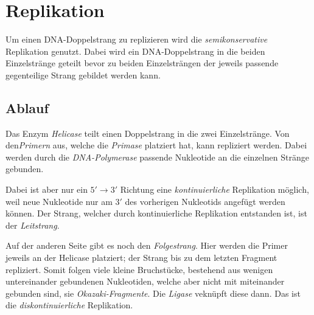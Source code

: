 \documentclass{article}
\begin{document}
\section{Replikation}
Um einen DNA-Doppelstrang zu replizieren wird die \emph{semikonservative} Replikation genutzt. Dabei wird ein DNA-Doppelstrang in die beiden Einzelstränge geteilt bevor zu beiden Einzelsträngen der jeweils passende gegenteilige Strang gebildet werden kann.
 
\subsection{Ablauf}
Das Enzym \emph{Helicase} teilt einen Doppelstrang in die zwei Einzelstränge. Von den\emph{Primern} aus, welche die \emph{Primase} platziert hat, kann repliziert werden. Dabei werden durch die \emph{DNA-Polymerase} passende Nukleotide an die einzelnen Stränge gebunden.
 
Dabei ist aber nur ein $5' \rightarrow 3'$ Richtung eine \emph{kon­ti­nu­ier­liche} Replikation möglich, weil neue Nukleotide nur am $3'$ des vorherigen Nukleotids angefügt werden können. Der Strang, welcher durch kontinuierliche Replikation entstanden ist, ist der \emph{Leitstrang}.
 
Auf der anderen Seite gibt es noch den \emph{Folgestrang}. Hier werden die Primer jeweils an der Helicase platziert; der Strang bis zu dem letzten Fragment repliziert. Somit folgen viele kleine Bruchstücke, bestehend aus wenigen untereinander gebundenen Nukleotiden, welche aber nicht mit miteinander gebunden sind, sie \emph{Okazaki-Fragmente}. Die \emph{Ligase} veknüpft diese dann. Das ist die \emph{diskon­ti­nu­ier­liche} Replikation.
\end{document}
